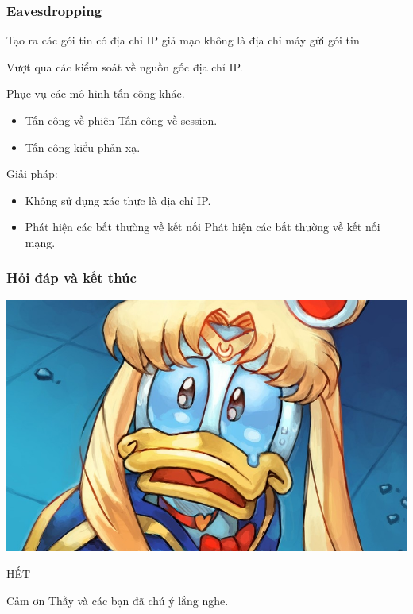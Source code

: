 \documentclass{beamer}
\begin{document}
\begin{frame}
    \frametitle{Eavesdropping}
    \begin{block}{}
        Tạo ra các gói tin có địa chỉ IP giả mạo không là địa chỉ máy gửi gói tin
    \end{block}
    \begin{block}{}
        Vượt qua các kiểm soát về nguồn gốc địa chỉ IP.
    \end{block}
    \begin{block}{}
        Phục vụ các mô hình tấn công khác.
        \begin{itemize}
            \item Tấn công về phiên Tấn công về session.
            \item Tấn công kiểu phản xạ.
        \end{itemize}
    \end{block}
    \begin{block}{}
        Giải pháp:
        \begin{itemize}
            \item Không sử dụng xác thực là địa chỉ IP.
            \item Phát hiện các bất thường về kết nối Phát hiện các bất thường về kết nối mạng.
        \end{itemize}
    \end{block}
\end{frame}


\begin{frame}
    \frametitle{Hỏi đáp và kết thúc}
    \includegraphics[width=\textwidth]{images/ask_and_answer.jpg}
\end{frame}




\begin{frame}
    \Huge{\centerline{HẾT}}
    \Large{\centerline{Cảm ơn Thầy và các bạn đã chú ý lắng nghe.}}
\end{frame}

\end{document}
